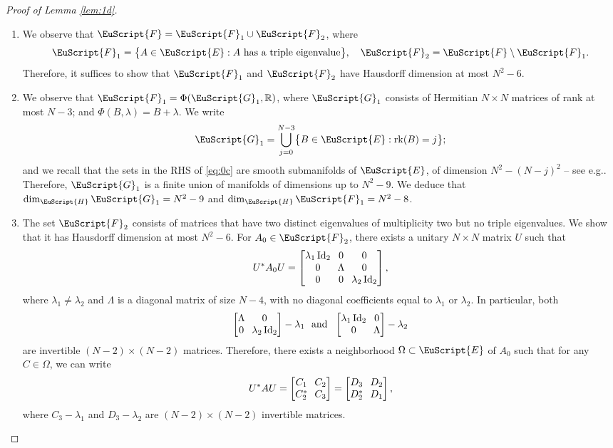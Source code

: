 \documentclass[10pt]{amsart}
\let\pazocal\EuScript
\let\sep:
\theoremstyle{definition}
\DeclareMathOperator{\Id}{Id}
\DeclareMathOperator{\rk}{rk}
\newcommand{\FF}{\pazocal{F}}
\newcommand{\GG}{\pazocal{G}}
\newcommand{\EE}{\pazocal{E}}
\newcommand{\HH}{\pazocal{H}}
\newcommand{\R}{\mathbb{R}}
\newcommand{\matrice}[1]{\arraycolsep3.5pt\begin{bmatrix}#1\end{bmatrix}}
\providecommand{\skpt}{\par\smallskip\noindent}
\providecommand{\eg}{e.g.}\providecommand{\ie}{i.e.}\providecommand{\etc}{etc.}\providecommand{\resp}{resp.}\providecommand{\cf}{cf.}
\begin{document}
\skpt
\begin{proof}[Proof of Lemma \ref{lem:1d}]
\begin{enumerate}
\item
We observe that $\FF= \FF_1 \cup \FF_2$, where
\begin{equation*}
\FF_1 = \bigl\{A \in \EE \sep \text{$A$ has a triple eigenvalue} \bigr\}, \quad
\FF_2 = \FF \setminus \FF_1.
\end{equation*}
Therefore, it suffices to show that $\FF_1$ and $\FF_2$ have Hausdorff dimension at most $N^2-6$.

\item
We observe that $\FF_1 = \Phi(\GG_1,\R)$, where $\GG_1$ consists of Hermitian $N \times N$ matrices of rank at most $N-3$; and $\Phi(B,\lambda) = B+\lambda$. We write
\begin{equation}\label{eq:0c}
\GG_1 = \bigcup_{j=0}^{N-3} \bigl\{ B \in \EE \sep \rk(B) = j\bigr\};
\end{equation}
and we recall that the sets in the RHS of \eqref{eq:0c} are smooth submanifolds of $\EE$, of dimension $N^2-(N-j)^2$ -- see \eg \cite[\S1.4]{GP74}. Therefore, $\GG_1$ is a finite union of manifolds of dimensions up to $N^2-9$. We deduce that $\dim_{\HH}\GG_1 = N^2-9$ and $\dim_\HH \FF_1 = N^2-8$.

\item
The set $\FF_2$ consists of matrices that have two distinct eigenvalues of multiplicity two but no triple eigenvalues.
We show that it has Hausdorff dimension at most $N^2-6$. For $A_0 \in \FF_2$, there exists a unitary $N \times N$ matrix $U$ such that
\begin{equation*}
U^* A_0 U= \matrice{\lambda_1 \Id_2 & 0 & 0 \\ 0 & \Lambda & 0 \\ 0 & 0 & \lambda_2 \Id_2},
\end{equation*}
where $\lambda_1 \neq \lambda_2$ and $\Lambda$ is a diagonal matrix of size $N-4$, with no diagonal coefficients equal to $\lambda_1$ or $\lambda_2$. In particular, both
\begin{equation*}
\matrice{\Lambda & 0 \\ 0 & \lambda_2 \Id_2} - \lambda_1 \ \ \text{and} \ \ \matrice{\lambda_1 \Id_2 & 0 \\ 0 & \Lambda } - \lambda_2
\end{equation*}
are invertible $(N-2) \times (N-2)$ matrices. Therefore, there exists a neighborhood $\Omega \subset \EE$ of $A_0$ such that for any $C \in \Omega$, we can write
\begin{equation*}
U^* A U = \matrice{C_1 & C_2 \\ C_2^* & C_3} = \matrice{D_3 & D_2 \\ D_2^* & D_1} ,
\end{equation*}
where $C_3 - \lambda_1$ and $D_3-\lambda_2$ are $(N-2) \times (N-2)$ invertible matrices.


\end{enumerate}
\end{proof}
\end{document}
